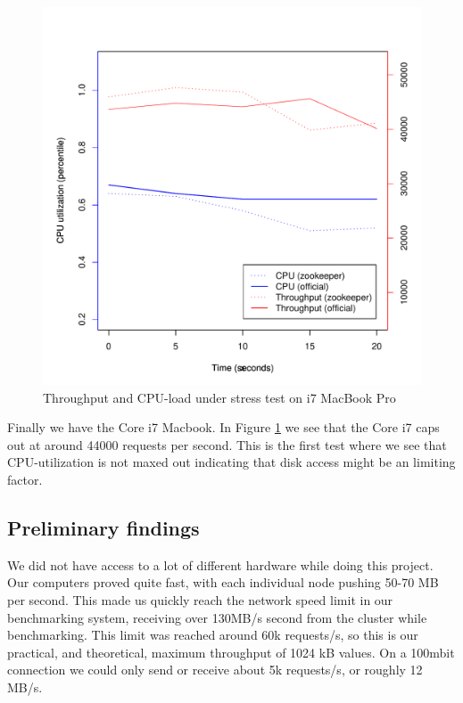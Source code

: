 \begin{figure}[h]
    \centering
    \includegraphics[width=1.0\textwidth]{results/throughput/singlenode/throughput_eivind}
    \caption{Throughput and CPU-load under stress test on i7 MacBook Pro}
    \label{fig:thug_eivind}
\end{figure}

Finally we have the Core i7 Macbook. In Figure \ref{fig:thug_eivind} we see that the Core i7 caps out at around 44000 requests per second. This is the first test where we see that CPU-utilization is not maxed out indicating that disk access might be an limiting factor. 

\subsection{Preliminary findings}
We did not have access to a lot of different hardware while doing this project. Our computers proved quite fast, with each individual node pushing 50-70 MB per second. This made us quickly reach the network speed limit in our benchmarking system, receiving over 130MB/s second from the cluster while benchmarking. This limit was reached around 60k requests/s, so this is our practical, and theoretical, maximum throughput of 1024 kB values. On a 100mbit connection we could only send or receive about 5k requests/s, or roughly 12 MB/s. 

